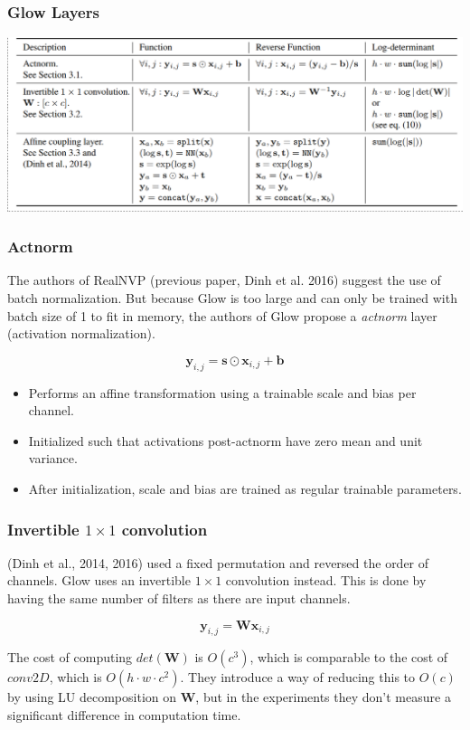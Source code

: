 \documentclass{beamer}
\begin{document}
\begin{frame}
  \frametitle{Glow Layers}

  \includegraphics[width=1.0\textwidth]{glow-layers-arch.png}
\end{frame}


\begin{frame}
  \frametitle{Actnorm}

  The authors of RealNVP (previous paper, Dinh et al. 2016) suggest the use of
  batch normalization. But because Glow is too large and can only be trained
  with batch size of 1 to fit in memory, the authors of Glow propose a
  \emph{actnorm} layer (activation normalization).

  \[
    \symbf{y}_{i,j} = \symbf{s} \odot \symbf{x}_{i,j} + \symbf{b}
  \]

  \begin{itemize}
    \item Performs an affine transformation using a trainable scale and bias
      per channel.

    \item Initialized such that activations post-actnorm have zero mean and
      unit variance.

    \item After initialization, scale and bias are trained as regular trainable
      parameters.
  \end{itemize}


\end{frame}

\begin{frame}
  \frametitle{Invertible $1\times1$ convolution}

  (Dinh et al., 2014, 2016) used a fixed permutation and reversed the order of
  channels. Glow uses an invertible $1\times1$ convolution instead. This is
  done by having the same number of filters as there are input channels.

  \[
    \symbf{y}_{i,j} = \symbf{W}\symbf{x}_{i,j}
  \]

  The cost of computing $det(\symbf{W})$ is $O(c^3)$, which is comparable to the cost
  of $conv2D$, which is $O(h \cdot w \cdot c^2)$. They introduce
  a way of reducing this to $O(c)$ by using LU decomposition on $\symbf{W}$, but in the
  experiments they don't measure a significant difference in computation time.
\end{frame}
\end{document}
